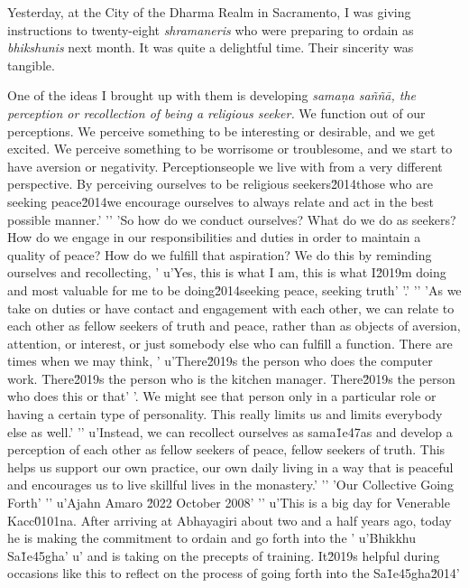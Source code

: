 
Yesterday, at the City of the Dharma Realm in Sacramento, I was giving 
instructions to twenty-eight \emph{shramaneris} who were preparing to 
ordain as \emph{bhikshunis} next month. It was quite a delightful time. 
Their sincerity was tangible.

One of the ideas I brought up with them is developing \emph{samaṇa 
saññā, the perception or recollection of being a religious seeker.} 
We function out of our perceptions. We perceive something to be 
interesting or desirable, and we get excited. We perceive something to 
be worrisome or troublesome, and we start to have aversion or 
negativity. Perceptionseople we live with from a very different perspective. By perceiving ourselves to be religious seekers\u2014those who are seeking peace\u2014we encourage ourselves to always relate and act in the best possible manner.'
'\n'
'So how do we conduct ourselves? What do we do as seekers? How do we engage in our responsibilities and duties in order to maintain a quality of peace? How do we fulfill that aspiration? We do this by reminding ourselves and recollecting, '
u'Yes, this is what I am, this is what I\u2019m doing and most valuable for me to be doing\u2014seeking peace, seeking truth'
'.'
'\n'
'As we take on duties or have contact and engagement with each other, we can relate to each other as fellow seekers of truth and peace, rather than as objects of aversion, attention, or interest, or just somebody else who can fulfill a function. There are times when we may think, '
u'There\u2019s the person who does the computer work. There\u2019s the person who is the kitchen manager. There\u2019s the person who does this or that'
'. We might see that person only in a particular role or having a certain type of personality. This really limits us and limits everybody else as well.'
'\n'
u'Instead, we can recollect ourselves as sama\u1e47as and develop a perception of each other as fellow seekers of peace, fellow seekers of truth. This helps us support our own practice, our own daily living in a way that is peaceful and encourages us to live skillful lives in the monastery.'
'\n'
'Our Collective Going Forth'
'\n'
u'Ajahn Amaro \u2022 October 2008'
'\n'
u'This is a big day for Venerable Kacc\u0101na. After arriving at Abhayagiri about two and a half years ago, today he is making the commitment to ordain and go forth into the '
u'Bhikkhu Sa\u1e45gha'
u' and is taking on the precepts of training. It\u2019s helpful during occasions like this to reflect on the process of going forth into the Sa\u1e45gha\u2014'
